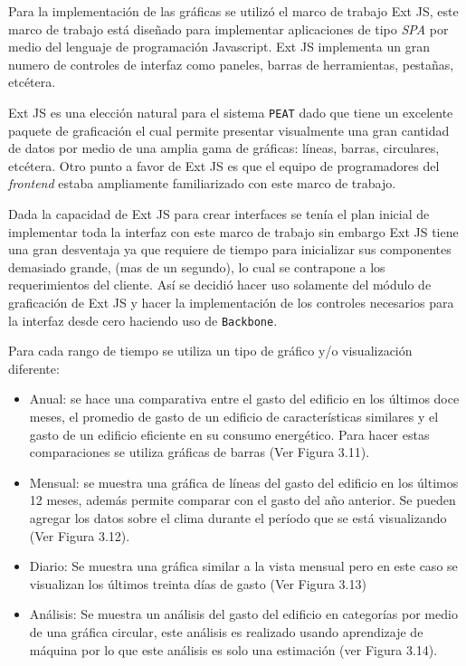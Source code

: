 Para la implementación de las gráficas se utilizó el marco de trabajo
Ext JS, este marco de trabajo está diseñado para implementar aplicaciones
de tipo \textit{SPA} por medio del lenguaje de programación Javascript.
Ext JS implementa un gran numero de controles de interfaz como paneles,
barras de herramientas, pestañas, etcétera.

Ext JS es una elección natural para el sistema \texttt{PEAT} dado que tiene un
excelente paquete de graficación el cual permite presentar visualmente una gran
cantidad de datos por medio de una amplia gama de gráficas: líneas, barras,
circulares, etcétera. Otro punto a favor de Ext JS es que el equipo de programadores
del \textit{frontend} estaba ampliamente familiarizado con este marco de trabajo.

Dada la capacidad de Ext JS para crear interfaces se tenía el plan inicial
de implementar toda la interfaz con este marco de trabajo sin embargo Ext JS tiene
una gran desventaja ya que requiere de tiempo para inicializar sus componentes
demasiado grande, (mas de un segundo), lo cual se contrapone a los requerimientos
del cliente.
Así se decidió hacer uso solamente del módulo de graficación de Ext JS y
hacer la implementación de los controles necesarios para la interfaz desde cero
haciendo uso de \texttt{Backbone}.


Para cada rango de tiempo se utiliza un tipo de gráfico y/o visualización diferente:

\begin{itemize}
\item Anual: se hace una comparativa entre el gasto del edificio en los últimos doce
  meses, el promedio de gasto de un edificio de características similares y
  el gasto de un edificio eficiente en su consumo energético. Para hacer estas
  comparaciones se utiliza gráficas de barras (Ver Figura 3.11).
\item Mensual: se muestra una gráfica de líneas del gasto del edificio
  en los últimos 12 meses, además permite comparar con el gasto del año anterior.
  Se pueden agregar los datos sobre el clima durante el período que se está
  visualizando (Ver Figura 3.12).
\item Diario: Se muestra una gráfica similar a la vista mensual pero en este caso
  se visualizan los últimos treinta días de gasto (Ver Figura 3.13)
\item Análisis: Se muestra un análisis del gasto del edificio en categorías
  por medio de una gráfica circular, este análisis es realizado usando
  aprendizaje de máquina por lo que este análisis es solo una estimación
  (ver Figura 3.14).
\end{itemize}

